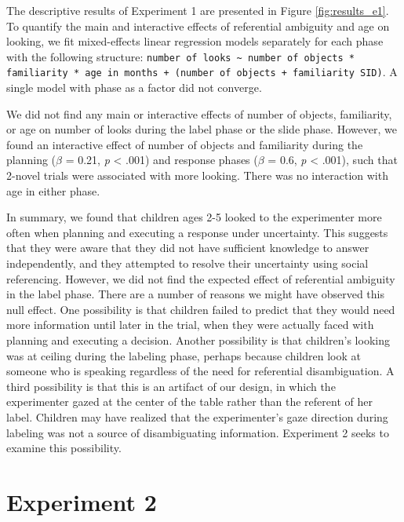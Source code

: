 \documentclass[10pt, letterpaper]{article}
\begin{document}
The descriptive results of Experiment 1 are presented in Figure
\ref{fig:results_e1}. To quantify the main and interactive effects of
referential ambiguity and age on looking, we fit mixed-effects linear
regression models separately for each phase with the following
structure:
\texttt{number of looks \textasciitilde{} number of objects * familiarity * age in months + (number of objects + familiarity \textbar{} SID)}.
A single model with phase as a factor did not converge.

We did not find any main or interactive effects of number of objects,
familiarity, or age on number of looks during the label phase or the
slide phase. However, we found an interactive effect of number of
objects and familiarity during the planning (\(\beta\) = 0.21, \emph{p}
\textless{} .001) and response phases (\(\beta\) = 0.6, \emph{p}
\textless{} .001), such that 2-novel trials were associated with more
looking. There was no interaction with age in either phase.

In summary, we found that children ages 2-5 looked to the experimenter
more often when planning and executing a response under uncertainty.
This suggests that they were aware that they did not have sufficient
knowledge to answer independently, and they attempted to resolve their
uncertainty using social referencing. However, we did not find the
expected effect of referential ambiguity in the label phase. There are a
number of reasons we might have observed this null effect. One
possibility is that children failed to predict that they would need more
information until later in the trial, when they were actually faced with
planning and executing a decision. Another possibility is that
children's looking was at ceiling during the labeling phase, perhaps
because children look at someone who is speaking regardless of the need
for referential disambiguation. A third possibility is that this is an
artifact of our design, in which the experimenter gazed at the center of
the table rather than the referent of her label. Children may have
realized that the experimenter's gaze direction during labeling was not
a source of disambiguating information. Experiment 2 seeks to examine
this possibility.

\section{Experiment 2}\label{experiment-2}
\end{document}
